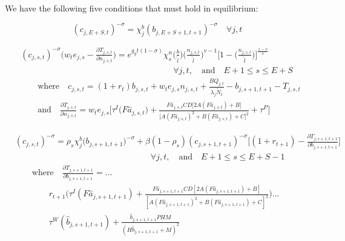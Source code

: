 \documentclass[letterpaper,12pt]{article}
\theoremstyle{definition}
\begin{document}
We have the following five conditions that must hold in equilibrium:

    \begin{equation}\label{EqEulerSavEpS}
      (c_{j,E+S,t})^{-\sigma} = \chi^b_j(b_{j,E+S+1,t+1})^{-\sigma} \quad\forall j,t
    \end{equation}

        \begin{equation}\label{EqEulerLabGen}
      \begin{split}
        &(c_{j,s,t})^{-\sigma}\Biggl(w_t e_{j,s} - \frac{\partial T_{j,s,t}}{\partial n_{j,s,t}}\Biggr) = e^{g_y t(1-\sigma)}\chi^n_{s}\biggl(\frac{b}{\tilde{l}}\biggr)\biggl(\frac{n_{j,s,t}}{\tilde{l}}\biggr)^{v-1}\Biggl[1 - \biggl(\frac{n_{j,s,t}}{\tilde{l}}\biggr)\Biggr]^{\frac{1-v}{v}} \\
        &\qquad\qquad\qquad\qquad\qquad\qquad\qquad\qquad\qquad\forall j,t, \quad\text{and}\quad E+1\leq s\leq E+S \\
        &\qquad\text{where}\quad c_{j,s,t} = \left(1 + r_t\right) b_{j,s,t} + w_t e_{j,s}n_{j,s,t} + \frac{BQ_{j,t}}{\lambda_j\tilde{N}_t} - b_{j,s+1,t+1} - T_{j,s,t} \\
        &\qquad\text{and}\quad \frac{\partial T_{j,s,t}}{\partial n_{j,s,t}} = w_t e_{j,s}\biggl[\tau^I\bigl(F\hat{a}_{j,s,t}\bigr) + \frac{F\hat{a}_{j,s,t}CD\bigl[2A(F\hat{a}_{j,s,t})+B\bigr]}{\bigl[A(F\hat{a}_{j,s,t})^2+B(F \hat{a}_{j,s,t})+C\bigr]^2} + \tau^P\Biggr] 
      \end{split}
    \end{equation}


    \begin{equation}\label{EqEulerSavGen}
      \begin{split}
        &(c_{j,s,t})^{-\sigma} = \rho_s\chi^b_j\bigl(b_{j,s+1,t+1}\bigr)^{-\sigma} + \beta(1-\rho_s)(c_{j,s+1,t+1})^{-\sigma}\Biggl[(1 + r_{t+1}) - \frac{\partial T_{j,s+1,t+1}}{\partial b_{j,s+1,t+1}}\Biggr] \\
        &\qquad\qquad\qquad\qquad\qquad\qquad\qquad\qquad\forall j,t,\quad\text{and}\quad E+1\leq s \leq E+S-1 \\
        &\qquad\text{where}\quad \frac{\partial T_{j,s+1,t+1}}{\partial b_{j,s+1,t+1}} = ...\\
        &\qquad\qquad r_{t+1}\Biggl(\tau^I(F\hat{a}_{j,s+1,t+1}) + \frac{F\hat{a}_{j,s+1,t+1}CD\left[2A(F\hat{a}_{j,s+1,t+1}) + B\right]}{\left[A(F\hat{a}_{j,s+1,t+1})^2 + B(F\hat{a}_{j,s+1,t+1}) + C\right]^2}\Biggr) ... \\
        &\qquad\qquad \tau^W(\hat{b}_{j,s+1,t+1}) + \frac{\hat{b}_{j,s+1,t+1}PHM}{\left(H\hat{b}_{j,s+1,t+1} + M\right)^2}
      \end{split}
    \end{equation}
    
\end{document}
